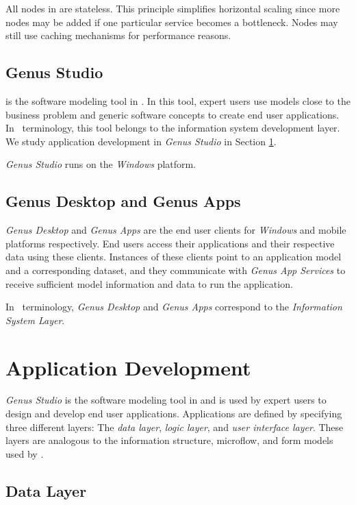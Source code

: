 All nodes in  are stateless. This principle simplifies horizontal scaling since more nodes may be added if one particular service becomes a bottleneck. Nodes may still use caching mechanisms for performance reasons.

\subsection{Genus Studio}
\label{sub:Genus Studio}
 is the software modeling tool in \gap. In this tool, expert users use models close to the business problem and generic software concepts to create end user applications. In \mde~terminology, this tool belongs to the information system development layer. We study application development in \textit{Genus Studio} in Section \ref{sec:Application Development}.

\textit{Genus Studio} runs on the \textit{Windows} platform.

\subsection{Genus Desktop and Genus Apps}
\label{sub:Genus Desktop and Genus Apps}
\textit{Genus Desktop} and \textit{Genus Apps} are the end user clients for \textit{Windows} and mobile platforms respectively. End users access their applications and their respective data using these clients. Instances of these clients point to an application model and a corresponding dataset, and they communicate with \textit{Genus App Services} to receive sufficient model information and data to run the application. 

In \mdd~terminology, \textit{Genus Desktop} and \textit{Genus Apps} correspond to the \textit{Information System Layer}.

\section{Application Development}
\label{sec:Application Development}
\textit{Genus Studio} is the software modeling tool in \gap and is used by expert users to design and develop end user applications. Applications are defined by specifying three different layers: The \textit{data layer}, \textit{logic layer}, and \textit{user interface layer}. These layers are analogous to the information structure, microflow, and form models used by \mendix.

\subsection{Data Layer}
\label{sub:Data Layer}

